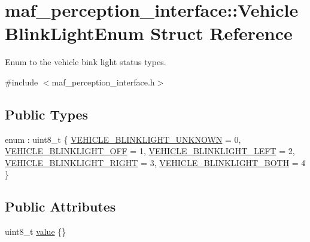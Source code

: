 \hypertarget{structmaf__perception__interface_1_1VehicleBlinkLightEnum}{}\section{maf\+\_\+perception\+\_\+interface\+:\+:Vehicle\+Blink\+Light\+Enum Struct Reference}
\label{structmaf__perception__interface_1_1VehicleBlinkLightEnum}


Enum to the vehicle bink light status types.  




{\ttfamily \#include $<$maf\+\_\+perception\+\_\+interface.\+h$>$}

\subsection*{Public Types}
\begin{DoxyCompactItemize}
\item 
enum \+: uint8\+\_\+t \{ \newline
\hyperlink{structmaf__perception__interface_1_1VehicleBlinkLightEnum_a615f1a0dac3be524a103189f2cc44fffa177d0b544a09c8e621702df1143199a3}{V\+E\+H\+I\+C\+L\+E\+\_\+\+B\+L\+I\+N\+K\+L\+I\+G\+H\+T\+\_\+\+U\+N\+K\+N\+O\+WN} = 0, 
\hyperlink{structmaf__perception__interface_1_1VehicleBlinkLightEnum_a615f1a0dac3be524a103189f2cc44fffa8d9ab8b5bc708e18652d187cf587278c}{V\+E\+H\+I\+C\+L\+E\+\_\+\+B\+L\+I\+N\+K\+L\+I\+G\+H\+T\+\_\+\+O\+FF} = 1, 
\hyperlink{structmaf__perception__interface_1_1VehicleBlinkLightEnum_a615f1a0dac3be524a103189f2cc44fffa091d4f64c9f344a5d4cc71b8b735aff3}{V\+E\+H\+I\+C\+L\+E\+\_\+\+B\+L\+I\+N\+K\+L\+I\+G\+H\+T\+\_\+\+L\+E\+FT} = 2, 
\hyperlink{structmaf__perception__interface_1_1VehicleBlinkLightEnum_a615f1a0dac3be524a103189f2cc44fffabc3cade075a41a9fd7c7320a43c95e7e}{V\+E\+H\+I\+C\+L\+E\+\_\+\+B\+L\+I\+N\+K\+L\+I\+G\+H\+T\+\_\+\+R\+I\+G\+HT} = 3, 
\newline
\hyperlink{structmaf__perception__interface_1_1VehicleBlinkLightEnum_a615f1a0dac3be524a103189f2cc44fffafe36f4300de6e300eb52e818de920af1}{V\+E\+H\+I\+C\+L\+E\+\_\+\+B\+L\+I\+N\+K\+L\+I\+G\+H\+T\+\_\+\+B\+O\+TH} = 4
 \}
\end{DoxyCompactItemize}
\subsection*{Public Attributes}
\begin{DoxyCompactItemize}
\item 
uint8\+\_\+t \hyperlink{structmaf__perception__interface_1_1VehicleBlinkLightEnum_acba43c375507d02568060058e3acbb0c}{value} \{\}
\end{DoxyCompactItemize}


